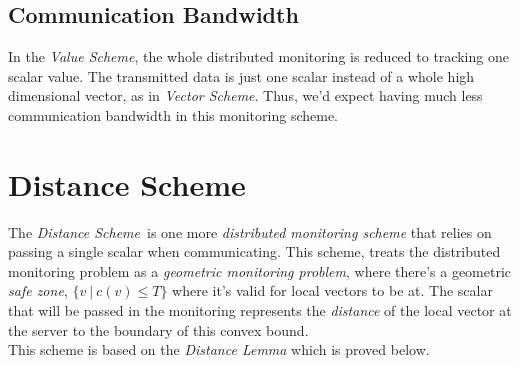 \documentclass[10pt, conference]{IEEEtran}
\newcommand{\vectorScheme}{\textit{Vector Scheme}}
\newcommand{\valueScheme}{\textit{Value Scheme}}
\newcommand{\distanceScheme}{\textit{Distance Scheme}}
\begin{document}
\subsection{Communication Bandwidth}
In the \valueScheme , the whole distributed monitoring is reduced to tracking one scalar value. The transmitted data is just one scalar instead of a whole high dimensional vector, as in \vectorScheme . Thus, we'd expect having much less communication bandwidth in this monitoring scheme.

\section{Distance Scheme}
The \distanceScheme \ is one more \textit{distributed monitoring scheme} that relies on passing a single scalar when communicating. This scheme, treats the distributed monitoring problem as a \textit{geometric monitoring problem}, where there's a geometric \textit{safe zone}, ${\{v \ | \ c(v) \leq T\}}$ where it's valid for local vectors to be at. The scalar that will be passed in the monitoring represents the \textit{distance} of the local vector at the server to the boundary of this convex bound.\\
This scheme is based on the \textit{Distance Lemma} which is proved below.
\end{document}

